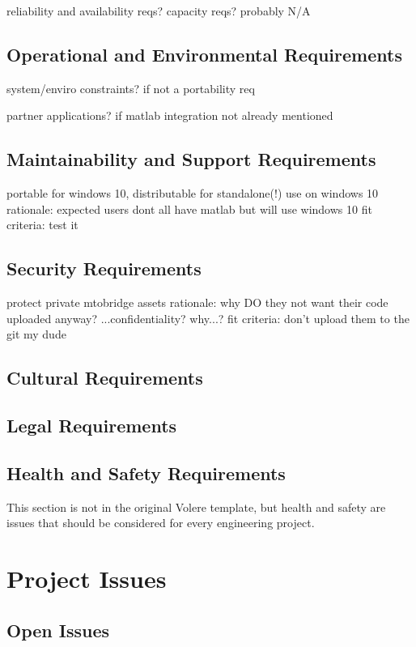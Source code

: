 \documentclass[12pt]{article}
\begin{document}
reliability and availability reqs? capacity reqs? probably N/A

\subsection{Operational and Environmental Requirements}

system/enviro constraints? if not a portability req

partner applications? if matlab integration not already mentioned

\subsection{Maintainability and Support Requirements}

portable for windows 10, distributable for standalone(!) use on windows 10
rationale: expected users dont all have matlab but will use windows 10
fit criteria: test it

\subsection{Security Requirements}

protect private mtobridge assets
rationale: why DO they not want their code uploaded anyway? ...confidentiality? why...?
fit criteria: don't upload them to the git my dude

\subsection{Cultural Requirements}

\subsection{Legal Requirements}

\subsection{Health and Safety Requirements}

This section is not in the original Volere template, but health and safety are
issues that should be considered for every engineering project.

\section{Project Issues}

\subsection{Open Issues}
\end{document}
